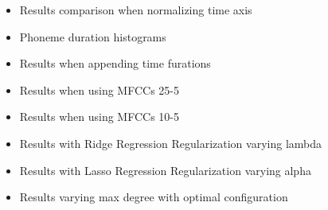 \begin{itemize}
	\item Results comparison when normalizing time axis
	\item Phoneme duration histograms
	\item Results when appending time furations
	\item Results when using MFCCs 25-5
	\item Results when using MFCCs 10-5
	\item Results with Ridge Regression Regularization varying lambda
	\item Results with Lasso Regression Regularization varying alpha
	\item Results varying max degree with optimal configuration
\end{itemize}
